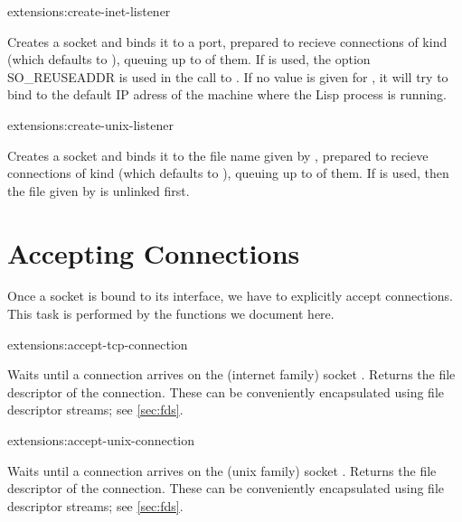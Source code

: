 \begin{defun}{extensions:}{create-inet-listener}{%
    }
                     
  Creates a socket and binds it to a port, prepared to recieve
  connections of kind  (which defaults to ),
  queuing up to  of them. If  
  is used, the option SO\_REUSEADDR is used in the call to .
  If no value is given for , it will try to bind to the
  default IP adress of the machine where the Lisp process is running.

\end{defun}

\begin{defun}{extensions:}{create-unix-listener}{%
    }
  
  Creates a socket and binds it to the file name given by ,
  prepared to recieve connections of kind  (which defaults
  to ), queuing up to  of them. If
    is used, then the file given by
   is unlinked first.

\end{defun}

\section{Accepting Connections}

Once a socket is bound to its interface, we have to explicitly accept
connections. This task is performed by the functions we document here.

\begin{defun}{extensions:}{accept-tcp-connection}{%
    }
  
  Waits until a connection arrives on the (internet family) socket
  . Returns the file descriptor of the connection.
  These can be conveniently encapsulated using file descriptor
  streams; see \ref{sec:fds}.

\end{defun}

\begin{defun}{extensions:}{accept-unix-connection}{%
    }

  Waits until a connection arrives on the (unix family) socket
  . Returns the file descriptor of the connection.
  These can be conveniently encapsulated using file descriptor
  streams; see \ref{sec:fds}.

\end{defun}


